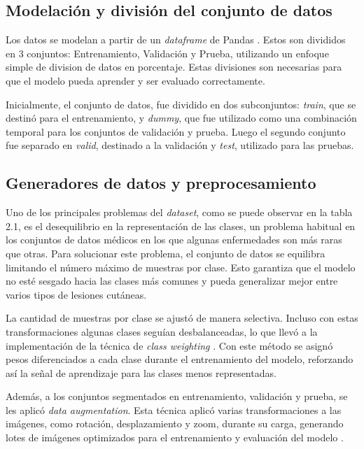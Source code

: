 \subsection{Modelación y división del conjunto de datos}

Los datos se modelan a partir de un \textit{dataframe} de Pandas . Estos son divididos en 3 conjuntos: Entrenamiento, Validación y Prueba, utilizando un enfoque simple de division de datos en porcentaje. Estas divisiones son necesarias para que el modelo pueda aprender y ser evaluado correctamente.

Inicialmente, el conjunto de datos, fue dividido en dos subconjuntos: \textit{train}, que se destinó para el entrenamiento, y \textit{dummy}, que fue utilizado como una combinación temporal para los conjuntos de validación y prueba. Luego el segundo conjunto fue separado en \textit{valid}, destinado a la validación y \textit{test}, utilizado para las pruebas.

\subsection{Generadores de datos y preprocesamiento}

Uno de los principales problemas del \textit{dataset}, como se puede observar en la tabla 2.1, es el desequilibrio en la representación de las clases, un problema habitual en los conjuntos de datos médicos en los que algunas enfermedades son más raras que otras. Para solucionar este problema, el conjunto de datos se equilibra limitando el número máximo de muestras por clase. Esto garantiza que el modelo no esté sesgado hacia las clases más comunes y pueda generalizar mejor entre varios tipos de lesiones cutáneas. 

La cantidad de muestras por clase se ajustó de manera selectiva. Incluso con estas transformaciones algunas clases seguían desbalanceadas, lo que llevó a la implementación de la técnica de \textit{class weighting} . Con este método se asignó pesos diferenciados a cada clase durante el entrenamiento del modelo, reforzando así la señal de aprendizaje para las clases menos representadas.

Además, a los conjuntos segmentados en entrenamiento, validación y prueba, se les aplicó \textit{data augmentation}. Esta técnica aplicó varias transformaciones a las imágenes, como rotación, desplazamiento y zoom, durante su carga, generando lotes de imágenes optimizados para el entrenamiento y evaluación del modelo .

